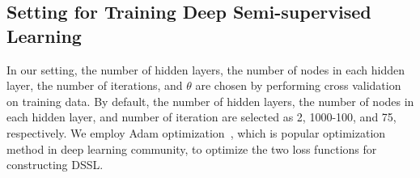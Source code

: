 
\subsection{Setting for Training Deep Semi-supervised Learning}
\label{sec:setting}
In our setting, the number of hidden layers, the number of nodes in each hidden layer, the number of iterations, and $\theta$ are chosen by performing cross validation on training data. By default, the number of hidden layers, the number of nodes in each hidden layer, and number of iteration are selected as 2, 1000-100, and 75, respectively. We employ Adam optimization~\cite{kingma2014adam}, which is popular optimization method in deep learning community, to optimize the two loss functions for constructing DSSL. %


%

